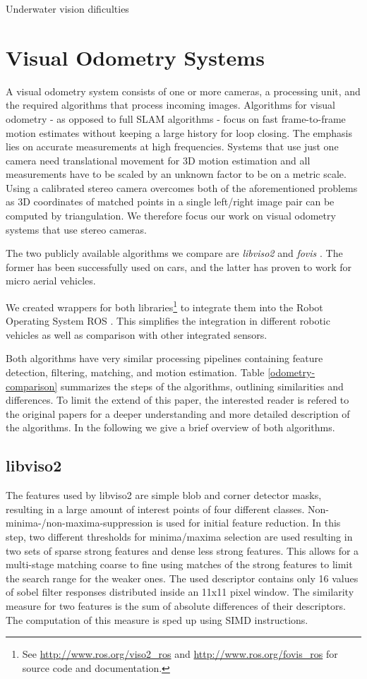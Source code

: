 \documentclass[conference]{IEEEtran}
\begin{document}
Underwater vision dificulties


\section{Visual Odometry Systems
  \label{visual-odometry-systems}
}
A visual odometry system consists of one or more cameras, a processing unit, and the required algorithms that process incoming images.
Algorithms for visual odometry - as opposed to full SLAM algorithms - focus on fast frame-to-frame motion estimates without keeping a large history for loop closing. The emphasis lies on accurate measurements at high frequencies. Systems that use just one camera need translational movement for 3D motion estimation and all measurements have to be scaled by an unknown factor to be on a metric scale. Using a calibrated stereo camera overcomes both of the aforementioned problems as 3D coordinates of matched points in a single left/right image pair can be computed by triangulation. We therefore focus our work on visual odometry systems that use stereo cameras.

The two publicly available algorithms we compare are \emph{libviso2} \cite{Geiger2011} and \emph{fovis} \cite{Huang2011}. The former has been successfully used on cars, and the latter has proven to work for micro aerial vehicles.

We created wrappers for both libraries\footnote{See \url{http://www.ros.org/viso2_ros} and \url{http://www.ros.org/fovis_ros} for source code and documentation.} to integrate them into the Robot Operating System ROS \cite{Quigley2009}. This simplifies the integration in different robotic vehicles as well as comparison with other integrated sensors.


Both algorithms have very similar processing pipelines containing feature detection, filtering, matching, and motion estimation. Table \ref{odometry-comparison} summarizes the steps of the algorithms, outlining similarities and differences. To limit the extend of this paper, the interested reader is refered to the original papers for a deeper understanding and more detailed description of the algorithms. In the following we give a brief overview of both algorithms.

\subsection{libviso2
  \label{libviso2}
}

The features used by libviso2 are simple blob and corner detector masks, resulting in a large amount of interest points of four different classes. Non-minima-/non-maxima-suppression is used for initial feature reduction. In this step, two different thresholds for minima/maxima selection are used resulting in two sets of sparse strong features and dense less strong features. This allows for a multi-stage matching coarse to fine using matches of the strong features to limit the search range for the weaker ones. The used descriptor contains only 16 values of sobel filter responses distributed inside an 11x11 pixel window. The similarity measure for two features is the sum of absolute differences of their descriptors. The computation of this measure is sped up using SIMD instructions.
\end{document}
